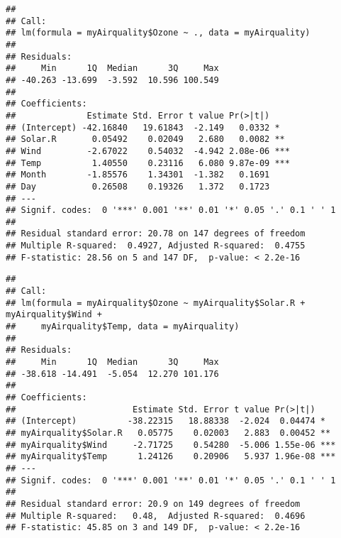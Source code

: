 \documentclass[]{article}
\newenvironment{Shaded}{\begin{snugshade}}{\end{snugshade}}
\newcommand{\KeywordTok}[1]{\textcolor[rgb]{0.13,0.29,0.53}{\textbf{#1}}}
\newcommand{\DataTypeTok}[1]{\textcolor[rgb]{0.13,0.29,0.53}{#1}}
\newcommand{\StringTok}[1]{\textcolor[rgb]{0.31,0.60,0.02}{#1}}
\newcommand{\OperatorTok}[1]{\textcolor[rgb]{0.81,0.36,0.00}{\textbf{#1}}}
\newcommand{\NormalTok}[1]{#1}
\begin{document}
\begin{verbatim}
## 
## Call:
## lm(formula = myAirquality$Ozone ~ ., data = myAirquality)
## 
## Residuals:
##     Min      1Q  Median      3Q     Max 
## -40.263 -13.699  -3.592  10.596 100.549 
## 
## Coefficients:
##              Estimate Std. Error t value Pr(>|t|)    
## (Intercept) -42.16840   19.61843  -2.149   0.0332 *  
## Solar.R       0.05492    0.02049   2.680   0.0082 ** 
## Wind         -2.67022    0.54032  -4.942 2.08e-06 ***
## Temp          1.40550    0.23116   6.080 9.87e-09 ***
## Month        -1.85576    1.34301  -1.382   0.1691    
## Day           0.26508    0.19326   1.372   0.1723    
## ---
## Signif. codes:  0 '***' 0.001 '**' 0.01 '*' 0.05 '.' 0.1 ' ' 1
## 
## Residual standard error: 20.78 on 147 degrees of freedom
## Multiple R-squared:  0.4927, Adjusted R-squared:  0.4755 
## F-statistic: 28.56 on 5 and 147 DF,  p-value: < 2.2e-16
\end{verbatim}

\begin{Shaded}
\end{Shaded}

\begin{verbatim}
## 
## Call:
## lm(formula = myAirquality$Ozone ~ myAirquality$Solar.R + myAirquality$Wind + 
##     myAirquality$Temp, data = myAirquality)
## 
## Residuals:
##     Min      1Q  Median      3Q     Max 
## -38.618 -14.491  -5.054  12.270 101.176 
## 
## Coefficients:
##                       Estimate Std. Error t value Pr(>|t|)    
## (Intercept)          -38.22315   18.88338  -2.024  0.04474 *  
## myAirquality$Solar.R   0.05775    0.02003   2.883  0.00452 ** 
## myAirquality$Wind     -2.71725    0.54280  -5.006 1.55e-06 ***
## myAirquality$Temp      1.24126    0.20906   5.937 1.96e-08 ***
## ---
## Signif. codes:  0 '***' 0.001 '**' 0.01 '*' 0.05 '.' 0.1 ' ' 1
## 
## Residual standard error: 20.9 on 149 degrees of freedom
## Multiple R-squared:   0.48,  Adjusted R-squared:  0.4696 
## F-statistic: 45.85 on 3 and 149 DF,  p-value: < 2.2e-16
\end{verbatim}
\end{document}
